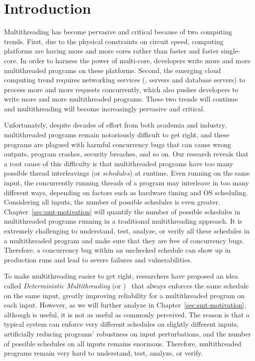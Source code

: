 \chapter{Introduction} \label{sec:intro}

Multithreading has become pervasive and critical because of two computing
trends. First, due to the physical constraints on circuit speed, computing
platforms are having more and more cores rather than faster and faster
single-core. In order to harness the power of multi-core, developers write more
and more multithreaded programs on these platforms. Second, the emerging cloud
computing trend requires networking services (\eg, \http servers and database
servers) to process more and more requests concurrently, which also pushes
developers to write more and more multithreaded programs. These two trends will
continue and multithreading will become increasingly pervasive and critical.

Unfortunately, despite decades of effort from both academia and industry,
multithreaded programs remain notoriously difficult to get right, and these
programs are plagued with harmful concurrency bugs that can cause wrong outputs,
program crashes, security breaches, and so on. Our research reveals that a root
cause of this difficulty is that multithreaded programs have too many
possible thread interleavings (or \emph{schedules}) at runtime. Even running on 
the same input, the concurrently running threads of a program may interleave in 
too many different ways, depending on factors such as hardware timing and OS
scheduling. Considering all inputs, the number of possible schedules is even
greater. Chapter~\ref{sec:smt-motivation} will quantify the number of
possible schedules in multithreaded programs running in a traditional
multithreading approach. It is extremely challenging to understand, test, 
analyze, or verify all these schedules in a multithreaded program and 
make sure that they are free of concurrency bugs. Therefore, a concurrency bug 
within an unchecked schedule can show up in production runs and lead to severe 
failures and vulnerabilities.

To make multithreading easier to get right, researchers have proposed an idea 
called \emph{Deterministic Multithreading} (or 
\emph{\dmt})~\cite{dthreads:sosp11, dpj:oopsla09, dmp:asplos09, kendo:asplos09, 
coredet:asplos10} that always enforces the same schedule on the same input, 
greatly improving reliability for a multithreaded program on each input. 
However, as we will further analyze in
Chapter~\ref{sec:smt-motivation}, although \dmt is useful, it is not as useful
as commonly perceived. The reason is that a typical \dmt system can enforce
very different schedules on slightly different inputs, artificially reducing
programs' robustness on input perturbations, and the number of possible
schedules on all inputs remains enormous. Therefore, multithreaded programs
remain very hard to understand, test, analyze, or verify.

